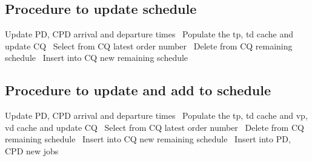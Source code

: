 \subsection{Procedure to update schedule}
\nwenddocs{}\endmoddef{}
\LA{}Update PD, CPD arrival and departure times~{\nwtagstyle{}}\RA{}
\LA{}Populate the tp, td cache and update CQ~{\nwtagstyle{}}\RA{}
\LA{}Select from CQ latest order number~{\nwtagstyle{}}\RA{}
\LA{}Delete from CQ remaining schedule~{\nwtagstyle{}}\RA{}
\LA{}Insert into CQ new remaining schedule~{\nwtagstyle{}}\RA{}
\nwendcode{}\nwdocspar

\subsection{Procedure to update and add to schedule}
\nwenddocs{}\endmoddef{}
\LA{}Update PD, CPD arrival and departure times~{\nwtagstyle{}}\RA{}
\LA{}Populate the tp, td cache and vp, vd cache and update CQ~{\nwtagstyle{}}\RA{}
\LA{}Select from CQ latest order number~{\nwtagstyle{}}\RA{}
\LA{}Delete from CQ remaining schedule~{\nwtagstyle{}}\RA{}
\LA{}Insert into CQ new remaining schedule~{\nwtagstyle{}}\RA{}
\LA{}Insert into PD, CPD new jobs~{\nwtagstyle{}}\RA{}
\nwendcode{}\nwdocspar


